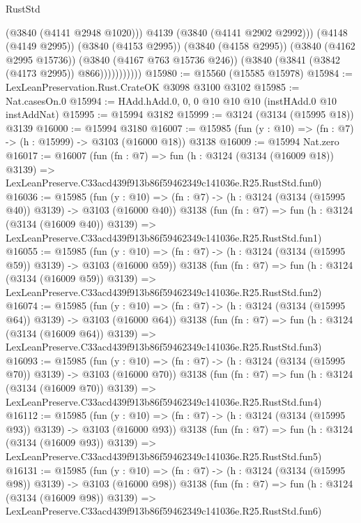 \begin{lexlean}{RustStd}
\begin{coremodule}
                          (@3840 (@4141 @2948 @1020)))
                        @4139
                        (@3840 (@4141 @2902 @2992)))
                      (@4148 (@4149 @2995))
                      (@3840 (@4153 @2995))
                      (@3840 (@4158 @2995))
                      (@3840 (@4162 @2995 @15736))
                      (@3840 (@4167 @763 @15736 @246))
                      (@3840 (@3841 (@3842 (@4173 @2995)) @866)))))))))))
@15980 := @15560 (@15585 @15978)
@15984 := LexLeanPreservation.Rust.CrateOK @3098 @3100 @3102
@15985 := Nat.casesOn.{0}
@15994 := HAdd.hAdd.{0, 0, 0} @10 @10 @10 (instHAdd.{0} @10 instAddNat)
@15995 := @15994 @3182
@15999 := @3124 (@3134 (@15995 @18)) @3139
@16000 := @15994 @3180
@16007 := @15985 (fun (y : @10) => (fn : @7) -> (h : @15999) -> @3103 (@16000 @18)) @3138
@16009 := @15994 Nat.zero
@16017 := @16007
    (fun (fn : @7) =>
    fun (h : @3124 (@3134 (@16009 @18)) @3139) =>
    LexLeanPreserve.C33acd439f913b86f59462349c141036e.R25.RustStd.fun0)
@16036 := @15985
    (fun (y : @10) => (fn : @7) -> (h : @3124 (@3134 (@15995 @40)) @3139) -> @3103 (@16000 @40))
    @3138
    (fun (fn : @7) =>
    fun (h : @3124 (@3134 (@16009 @40)) @3139) =>
    LexLeanPreserve.C33acd439f913b86f59462349c141036e.R25.RustStd.fun1)
@16055 := @15985
    (fun (y : @10) => (fn : @7) -> (h : @3124 (@3134 (@15995 @59)) @3139) -> @3103 (@16000 @59))
    @3138
    (fun (fn : @7) =>
    fun (h : @3124 (@3134 (@16009 @59)) @3139) =>
    LexLeanPreserve.C33acd439f913b86f59462349c141036e.R25.RustStd.fun2)
@16074 := @15985
    (fun (y : @10) => (fn : @7) -> (h : @3124 (@3134 (@15995 @64)) @3139) -> @3103 (@16000 @64))
    @3138
    (fun (fn : @7) =>
    fun (h : @3124 (@3134 (@16009 @64)) @3139) =>
    LexLeanPreserve.C33acd439f913b86f59462349c141036e.R25.RustStd.fun3)
@16093 := @15985
    (fun (y : @10) => (fn : @7) -> (h : @3124 (@3134 (@15995 @70)) @3139) -> @3103 (@16000 @70))
    @3138
    (fun (fn : @7) =>
    fun (h : @3124 (@3134 (@16009 @70)) @3139) =>
    LexLeanPreserve.C33acd439f913b86f59462349c141036e.R25.RustStd.fun4)
@16112 := @15985
    (fun (y : @10) => (fn : @7) -> (h : @3124 (@3134 (@15995 @93)) @3139) -> @3103 (@16000 @93))
    @3138
    (fun (fn : @7) =>
    fun (h : @3124 (@3134 (@16009 @93)) @3139) =>
    LexLeanPreserve.C33acd439f913b86f59462349c141036e.R25.RustStd.fun5)
@16131 := @15985
    (fun (y : @10) => (fn : @7) -> (h : @3124 (@3134 (@15995 @98)) @3139) -> @3103 (@16000 @98))
    @3138
    (fun (fn : @7) =>
    fun (h : @3124 (@3134 (@16009 @98)) @3139) =>
    LexLeanPreserve.C33acd439f913b86f59462349c141036e.R25.RustStd.fun6)

\end{coremodule}
\end{lexlean}
